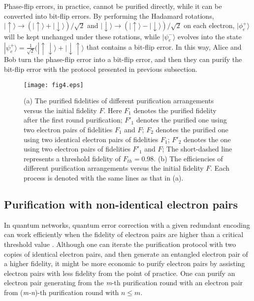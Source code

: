 \documentclass[aps,graphicx,twocolumn]{revtex4}%
\begin{document}
Phase-flip errors, in practice, cannot be purified directly, while it can be converted into bit-flip errors. By performing the Hadamard rotations, $|\uparrow\rangle\rightarrow(|\uparrow\rangle+|\downarrow\rangle)/\sqrt{2}$ and $|\downarrow\rangle\rightarrow(|\uparrow\rangle-|\downarrow\rangle)/\sqrt{2}$  on each electron, $|\phi^+_e\rangle$ will be kept unchanged under these rotations, while $|\psi^-_e\rangle$ evolves into the state $|\psi^+_e\rangle=\frac{1}{\sqrt{2}}(|\uparrow\downarrow\rangle+|\downarrow\uparrow\rangle$ that contains a bit-flip error. In this way, Alice and Bob turn the phase-flip error  into a bit-flip error, and then they can purify the bit-flip error with the protocol presented in previous subsection.

 \begin{figure}[tpb]
  \centering
  \texttt{[image: fig4.eps]}
  \caption{(a) The purified fidelities of different purification arrangements versus the initial fidelity $F$. Here $F_1$ denotes the purified fidelity after the first round purification; $F'_1$ denotes the purified one using two electron pairs of fidelities $F_1$ and $F$; $F_2$ denotes the purified one using two identical electron pairs of fidelities $F_1$; $F'_2$ denotes the one using two electron pairs of fidelities $F'_1$ and $F$; The short-dashed line represents a threshold fidelity of $F_{th}=0.98$. (b) The efficiencies of different purification arrangements versus the initial fidelity $F$. Each process is denoted with the same lines as that in (a).}\label{fig4}
\end{figure}

\subsection{Purification with non-identical electron pairs}

In quantum networks, quantum error correction with a given redundant encoding can work efficiently when the fidelity of electron pairs are higher than a  critical threshold value \cite{Qthresh1,Qthresh2}. Although one can iterate the purification protocol with two copies of identical electron pairs, and then generate an entangled electron pair of a higher fidelity, it might be more economic to purify electron pairs by assisting electron pairs with less fidelity from the point of practice. One can purify an electron pair generating from the \emph{m}-th purification round with an electron pair from {(\emph{m-n})}-th purification round with $n\leq m$.
\end{document}

